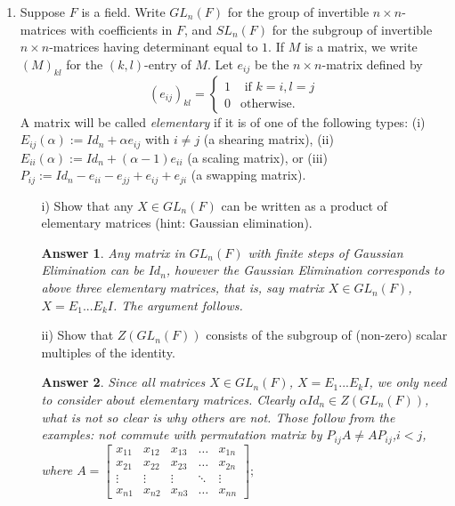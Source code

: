 \documentclass[11pt,leqno]{article}
\newcommand{\<}[1]{{\langle}#1 {\rangle}}
\theoremstyle{plain}
\newtheorem*{answer*}{Answer}
\theoremstyle{definition}
\theoremstyle{remark}
\numberwithin{equation}{section}
\begin{document}
\begin{enumerate}
\item Suppose $F$ is a field.  Write $GL_n(F)$ for the group of invertible $n \times n$-matrices with coefficients in $F$, and $SL_n(F)$ for the subgroup of invertible $n \times n$-matrices having determinant equal to $1$.  If $M$ is a matrix, we write $(M)_{kl}$ for the $(k,l)$-entry of $M$.  Let $e_{ij}$ be the $n \times n$-matrix defined by
    \[
    (e_{ij})_{kl} = \begin{cases} 1 & \text{ if } k=i, l = j \\ 0 & \text{otherwise.} \end{cases}
    \]
    A matrix will be called {\em elementary} if it is of one of the following types: (i) $E_{ij}(\alpha) := Id_n + \alpha e_{ij}$ with $i \neq j$ (a shearing matrix), (ii) $E_{ii}(\alpha) := Id_n + (\alpha - 1)e_{ii}$ (a scaling matrix), or (iii) $P_{ij} := Id_n - e_{ii} - e_{jj} + e_{ij} + e_{ji}$ (a swapping matrix).
    \begin{itemize}
    \item[i)] Show that any $X \in GL_n(F)$ can be written as a product of elementary matrices (hint: Gaussian elimination).
        \begin{answer*}
        Any matrix in $GL_n(F)$ with finite steps of Gaussian Elimination can be $Id_n$, however the Gaussian Elimination corresponds to above three elementary matrices, that is, say matrix $X\in GL_n(F)$, $X=E_1...E_kI $. The argument follows.
        \end{answer*}
    
    \item[ii)] Show that $Z(GL_n(F))$ consists of the subgroup of (non-zero) scalar multiples of the identity.
        \begin{answer*}
        Since all matrices $X\in GL_n(F)$, $X=E_1...E_kI$, we only need to consider about elementary matrices. Clearly $\alpha Id_n \in Z(GL_n(F))$, what is not so clear is why others are not. Those follow from the examples: not commute with permutation matrix by $P_{ij}A\neq AP_{ij}$,$i<j$, where  
                        $A=\begin{bmatrix}
                            x_{11} & x_{12} & x_{13} & \dots  & x_{1n} \\
                            x_{21} & x_{22} & x_{23} & \dots  & x_{2n} \\
                            \vdots & \vdots & \vdots & \ddots & \vdots \\
                            x_{n1} & x_{n2} & x_{n3} & \dots  & x_{nn}
                            \end{bmatrix};$
                            

\end{answer*}
\end{itemize}
\end{enumerate}
\end{document}
